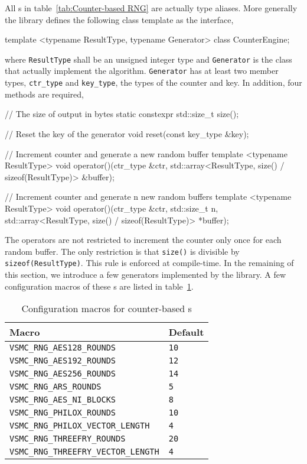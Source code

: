 All \rng{}s in table~\ref{tab:Counter-based RNG} are actually type aliases.
More generally the library defines the following class template as the
interface,
\begin{cppcode}
  template <typename ResultType, typename Generator>
  class CounterEngine;
\end{cppcode}
where \verb|ResultType| shall be an unsigned integer type and \verb|Generator|
is the class that actually implement the algorithm. \verb|Generator| has at
least two member types, \verb|ctr_type| and \verb|key_type|, the types of the
counter and key. In addition, four methods are required,
\begin{cppcode}
  // The size of output in bytes
  static constexpr std::size_t size();

  // Reset the key of the generator
  void reset(const key_type &key);

  // Increment counter and generate a new random buffer
  template <typename ResultType>
  void operator()(ctr_type &ctr,
      std::array<ResultType, size() / sizeof(ResultType)> &buffer);

  // Increment counter and generate n new random buffers
  template <typename ResultType>
  void operator()(ctr_type &ctr, std::size_t n,
      std::array<ResultType, size() / sizeof(ResultType)> *buffer);
\end{cppcode}
The operators are not restricted to increment the counter only once for each
random buffer. The only restriction is that \verb|size()| is divisible by
\verb|sizeof(ResultType)|. This rule is enforced at compile-time. In the
remaining of this section, we introduce a few generators implemented by the
library. A few configuration macros of these \rng{}s are listed in
table~\ref{tab:Configuration macros for counter-based RNGs}.

\begin{table}
  \begin{tabularx}{\textwidth}{XX}
    \toprule
    Macro & Default \\
    \midrule
    \verb|VSMC_RNG_AES128_ROUNDS|          & \verb|10| \\
    \verb|VSMC_RNG_AES192_ROUNDS|          & \verb|12| \\
    \verb|VSMC_RNG_AES256_ROUNDS|          & \verb|14| \\
    \verb|VSMC_RNG_ARS_ROUNDS|             & \verb|5|  \\
    \verb|VSMC_RNG_AES_NI_BLOCKS|          & \verb|8|  \\
    \verb|VSMC_RNG_PHILOX_ROUNDS|          & \verb|10| \\
    \verb|VSMC_RNG_PHILOX_VECTOR_LENGTH|   & \verb|4|  \\
    \verb|VSMC_RNG_THREEFRY_ROUNDS|        & \verb|20| \\
    \verb|VSMC_RNG_THREEFRY_VECTOR_LENGTH| & \verb|4|  \\
    \bottomrule
  \end{tabularx}
  \caption{Configuration macros for counter-based \rng{}s}
  \label{tab:Configuration macros for counter-based RNGs}
\end{table}

